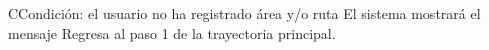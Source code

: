 	\begin{UCtrayectoriaA}{C}{Condición: el usuario no ha registrado área y/o ruta}
		\UCpaso[\UCsist] El sistema mostrará el mensaje 
		\UCpaso[\UCsist] Regresa al paso 1 de la trayectoria principal. 
	\end{UCtrayectoriaA}
